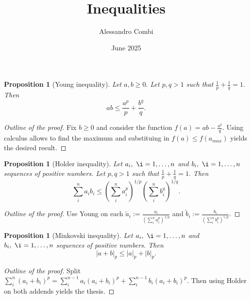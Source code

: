 \documentclass{article}
\title{Inequalities}
\author{Alessandro Combi}
\date{June 2025}
\newtheorem{proposition}[theorem]{Proposition}
\begin{document}
\maketitle
\tableofcontents
\clearpage

\begin{proposition}[Young inequality]
    Let $a,b \geq 0.$ Let $p, q > 1$ such that $\frac{1}{p} + \frac{1}{q} = 1.$ 
    Then
    \begin{equation}
        ab \leq \frac{a^p}{p} + \frac{b^q}{q}.
    \end{equation}
\end{proposition}
\begin{proof}[Outline of the proof]
    Fix $b \geq 0$ and consider the function $f(a) = ab - \frac{a^q}{q}.$
    Using calculus allows to find the maximum and substituing in $f(a) \leq f(a_{max})$ yields the desired result.
\end{proof}

\begin{proposition}[Holder inequality]
    Let $a_i,\ \i = 1,\ldots, n$ and $b_i,\ \i = 1,\ldots, n$ sequences of positive numbers. Let $p, q > 1$ such that $\frac{1}{p} + \frac{1}{q} = 1.$ 
    Then
    \begin{equation}
        \sum_i^n a_i b_i \leq \left( \sum_i^n a_i^p \right)^{1/p} \left( \sum_i^n b_i^q \right)^{1/q}.
    \end{equation}
\end{proposition}
\begin{proof}[Outline of the proof]
    Use Young on each $\tilde{a}_i := \frac{a_i}{\left( \sum_i^n a_i^p \right)^{1/p}}$ and $\tilde{b}_i := \frac{b_i}{\left( \sum_i^n b_i^p \right)^{1/p}}$. 
\end{proof}

\begin{proposition}[Minkovski inequality]
    Let $a_i,\ \i = 1,\ldots, n$ and $b_i,\ \i = 1,\ldots, n$ sequences of positive numbers. 
    Then 
    \begin{equation}
        | a + b |_p \leq |a|_p + |b|_p.
    \end{equation}
\end{proposition}
\begin{proof}[Outline of the proof]
    Split $\sum_i^n (a_i + b_i)^p = \sum_i^{n-1} a_i (a_i + b_i)^p + \sum_i^{n-1} b_i (a_i + b_i)^p.$
    Then using Holder on both addends yields the thesis.
\end{proof}
\end{document}
